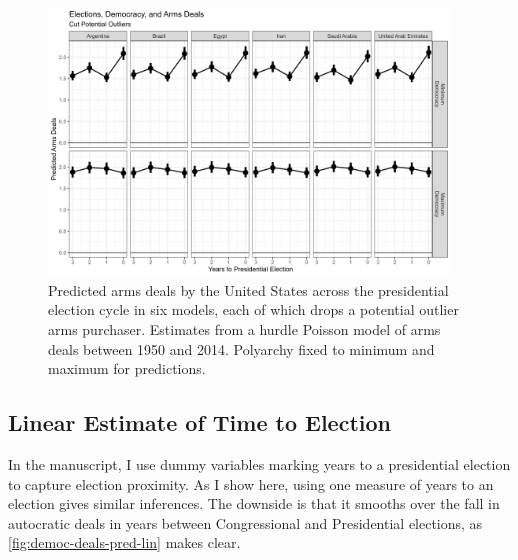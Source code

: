 \documentclass[12pt]{article}
\begin{document}
\begin{figure}[htpb]
	\centering
		\includegraphics[width=0.95\textwidth]{democ-deals-pred-drop.png}
	\caption{Predicted arms deals by the United States across the presidential election cycle in six models, each of which drops a potential outlier arms purchaser. Estimates from a hurdle Poisson model of arms deals between 1950 and 2014. Polyarchy fixed to minimum and maximum for predictions.}
	\label{fig:democ-deals-pred-drop}
\end{figure}


\subsection{Linear Estimate of Time to Election}

In the manuscript, I use dummy variables marking years to a presidential election to capture election proximity. 
As I show here, using one measure of years to an election gives similar inferences. 
The downside is that it smooths over the fall in autocratic deals in years between Congressional and Presidential elections, as \autoref{fig:democ-deals-pred-lin} makes clear. 
\end{document}
